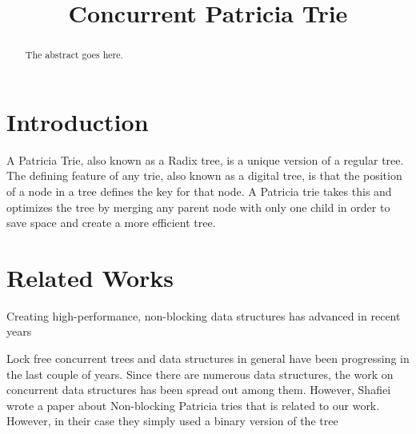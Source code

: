 \documentclass[conference]{IEEEtran}
\begin{document}
\title{Concurrent Patricia Trie}

\author{
\and
{}
}

\maketitle


\begin{abstract}
The abstract goes here.
\end{abstract}


\section{Introduction}
A Patricia Trie, also known as a Radix tree, is a unique version of a regular tree. The defining feature of any trie, also known
as a digital tree, is that the position of a node in a tree defines the key for that node. A Patricia trie takes this and optimizes the tree by 
merging any parent node with only one child in order to save space and create a more efficient tree.\cite{Shafiei2013} \par



\section{Related Works}
Creating high-performance, non-blocking data structures has advanced in recent years 


Lock free concurrent trees and data structures in general have been progressing in the last couple of years. \cite{Brown2014,Brown2013} Since there are numerous data structures, the work on concurrent data structures has been spread out among them. However, Shafiei wrote a paper about Non-blocking Patricia tries \cite{Shafiei2013} that is related to our work. However, in their case they simply used a binary version of the tree 
\end{document}
